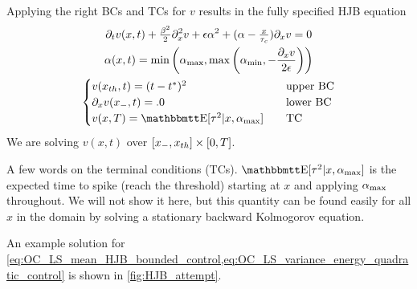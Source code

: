 \documentclass{article}
\begin{document}
Applying the right BCs and TCs for $v$ results in the fully specified HJB
equation
\begin{equation}
\begin{gathered}
\di_t v(x,t) + \tfrac{\b^2}{2} \di_x^2 v + 
\e \a^2 + (\a -\tfrac{x}{\tc}) \di_x v 
= 0
\\
\a (x,t) = \min \left(\amax, \max\left(\amin, -\frac{\di_x v}{2\e}\right)
\right)
\\
\begin{cases}
v(\xth,t) = (t-\T)^2  \quad & \textrm{upper BC}
\\
\di_x v(\xmin, t)  = .0  \quad &\textrm{lower BC}
\\
v(x,T)  = \Exp[\t^2|x, \amax]  \quad& \textrm{TC}
\end{cases}
\end{gathered}
\label{eq:OC_LS_HJB_full}
\end{equation} 
We are solving $v(x,t)$ over $[{ x_{-} }, { x_{th} }] \times [0,T]$.

A few words on the terminal conditions (TCs). $\Exp[\t^2|x, \amax]$ is the
expected time to spike (reach the threshold) starting at $x$ and applying
${ {\alpha}_{\textrm{max}} }$ throughout. We will not show it here, but this quantity can be found
easily for all $x$ in the domain by solving a stationary backward Kolmogorov
equation. 

An example solution for
\cref{eq:OC_LS_mean_HJB_bounded_control,eq:OC_LS_variance_energy_quadratic_control} is shown in \cref{fig:HJB_attempt}.
\end{document}
